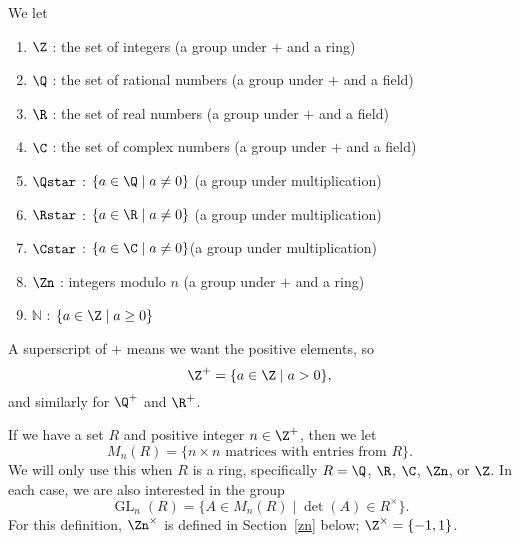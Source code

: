 \documentclass[12pt]{amsart}
\newcommand{\terminology}[1]{\textbf{\textit{#1}}}
\renewcommand{\terminology}[1]{#1}
\newcommand{\term}{\terminology}
\DeclareMathOperator{\GL}{GL}
\theoremstyle{plain}
\theoremstyle{definition}
\theoremstyle{remark}
\begin{document}
We let
\begin{enumerate}
\item[] $\term{\Z}$ :  the set of integers \quad (a group under $+$ and a ring)
\item[] $\term{\Q}$ :  the set of rational numbers  \quad (a group under $+$ and a field)
\item[] $\term{\R}$ :  the set of real numbers  \quad (a group under $+$ and a field)
\item[] $\term{\C}$ : the set of complex numbers \quad (a group under $+$ and a field)
\item[] $\term{\Qstar}$ : $\{a\in\Q\mid a\neq 0\}$ \quad (a group under multiplication)
\item[] $\term{\Rstar}$ : $\{a\in\R\mid a\neq 0\}$ \quad (a group under multiplication)
\item[] $\term{\Cstar}$ : $\{a\in\C\mid a\neq 0\}$\quad (a group under multiplication)
\item[] $\term{\Zn}$ :  integers modulo $n$ \quad (a group under $+$ and a ring)
\item[] $\term{\mathbb N}$ : $\{a\in\Z\mid a\geq 0\}$ 
\end{enumerate}
A superscript of $+$ means we want the positive elements, so
$$\term{\Z^+}=\{a\in \Z\mid a>0\},$$ and similarly for $\term{\Q^+}$ and $\term{\R^+}$.

If we have a set $R$ and positive integer $n\in\Z^+$, then we let
\[ M_n(R)=\{n\times n \text{ matrices with entries from $R$}\}.\]
We will only use this when $R$ is a ring, specifically $R=\Q$, $\R$,
$\C$, $\Zn$, or $\Z$.  
In each case, we are also interested in the group
\[ \GL_n(R) =\{A\in M_n(R)\mid \det(A)\in R^\times\}.\] 
For this definition, $\Zn^\times$ is defined in Section~\ref{zn}
below; $\Z^\times=\{-1,1\}$.
\end{document}
